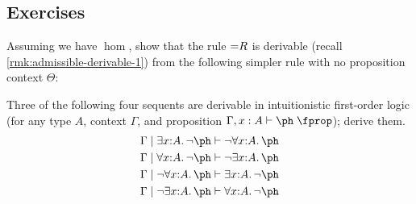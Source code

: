 


\subsection*{Exercises}

\begin{ex}\label{ex:eq-frob-from-hom}
  Assuming we have $\hom$, show that the rule $\eqR$ is derivable (recall \cref{rmk:admissible-derivable-1}) from the following simpler rule with no proposition context $\Theta$:
  \begin{mathpar}
  \end{mathpar}
\end{ex}

\begin{ex}\label{ex:quantifier-laws}
  Three of the following four sequents are derivable in intuitionistic first-order logic (for any type $A$,  context $\Gamma$, and proposition $\Gamma,x:A\types\ph\prop$); derive them.
  \begin{align*}
    \Gamma \cb \exists x:A. \neg \ph &\types \neg\forall x:A. \ph\\
    \Gamma \cb \forall x:A. \neg \ph &\types \neg\exists x:A. \ph\\
    \Gamma \cb \neg\forall x:A. \ph &\types \exists x:A. \neg \ph\\
    \Gamma \cb \neg\exists x:A. \ph &\types \forall x:A. \neg \ph
  \end{align*}
\end{ex}

